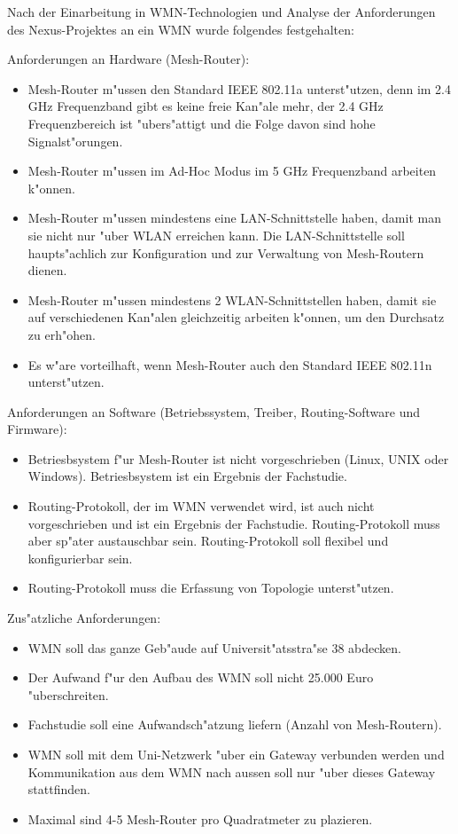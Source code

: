 Nach der Einarbeitung in WMN-Technologien und Analyse der Anforderungen
des Nexus-Projektes an ein WMN wurde folgendes festgehalten:

Anforderungen an Hardware (Mesh-Router):

\begin{itemize}
\item Mesh-Router m"ussen den Standard IEEE 802.11a unterst"utzen, denn
im 2.4 GHz Frequenzband gibt es keine freie Kan"ale mehr, der 2.4 GHz
Frequenzbereich ist "ubers"attigt und die Folge davon sind hohe
Signalst"orungen.
\item Mesh-Router m"ussen im Ad-Hoc Modus im 5 GHz Frequenzband arbeiten
k"onnen.
\item Mesh-Router m"ussen mindestens eine LAN-Schnittstelle haben, damit man
sie nicht nur "uber WLAN erreichen kann. Die LAN-Schnittstelle soll
haupts"achlich zur Konfiguration und zur Verwaltung von Mesh-Routern dienen.
\item Mesh-Router m"ussen mindestens 2 WLAN-Schnittstellen haben, damit sie
auf verschiedenen Kan"alen gleichzeitig arbeiten k"onnen, um den Durchsatz
zu erh"ohen.
\item Es w"are vorteilhaft, wenn Mesh-Router auch den Standard IEEE 802.11n
unterst"utzen.
\end{itemize}

Anforderungen an Software (Betriebssystem, Treiber, Routing-Software und
		Firmware):

\begin{itemize}
\item Betriesbsystem f"ur Mesh-Router ist nicht vorgeschrieben (Linux, UNIX oder
Windows). Betriesbsystem ist ein Ergebnis der Fachstudie.
\item Routing-Protokoll, der im WMN verwendet wird, ist auch nicht
vorgeschrieben und ist ein Ergebnis der Fachstudie. Routing-Protokoll muss
aber sp"ater austauschbar sein. Routing-Protokoll soll flexibel und
konfigurierbar sein.
\item Routing-Protokoll muss die Erfassung von Topologie unterst"utzen.
\end{itemize}

Zus"atzliche Anforderungen:

\begin{itemize}
\item WMN soll das ganze Geb"aude auf Universit"atsstra"se 38 abdecken.
\item Der Aufwand f"ur den Aufbau des WMN soll nicht 25.000 Euro "uberschreiten.
\item Fachstudie soll eine Aufwandsch"atzung liefern (Anzahl von Mesh-Routern).
\item WMN soll mit dem Uni-Netzwerk "uber ein Gateway verbunden werden und
Kommunikation aus dem WMN nach aussen soll nur "uber dieses Gateway
stattfinden.
\item Maximal sind 4-5 Mesh-Router pro Quadratmeter zu plazieren.
\end{itemize}


